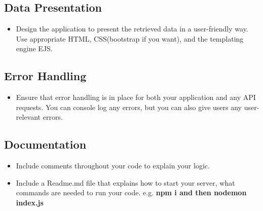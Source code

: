 \documentclass{article}
\begin{document}
\subsection{Data Presentation}
\begin{itemize}
  \item Design the application to present the retrieved data in a user-friendly way.
   Use appropriate HTML, CSS(bootstrap if you want), and the templating engine EJS.
\end{itemize}

\subsection{Error Handling}
\begin{itemize}
  \item Ensure that error handling is in place for both your application and any API 
  requests. You can console log any errors, but you can also give users any user-relevant errors.
\end{itemize}

\subsection{Documentation}
\begin{itemize}
  \item Include comments throughout your code to explain your logic.
  \item Include a Readme.md file that explains how to start your server, 
  what commands are needed to run your code. e.g.\textbf{ npm i  and then nodemon index.js}
\end{itemize}
\end{document}
